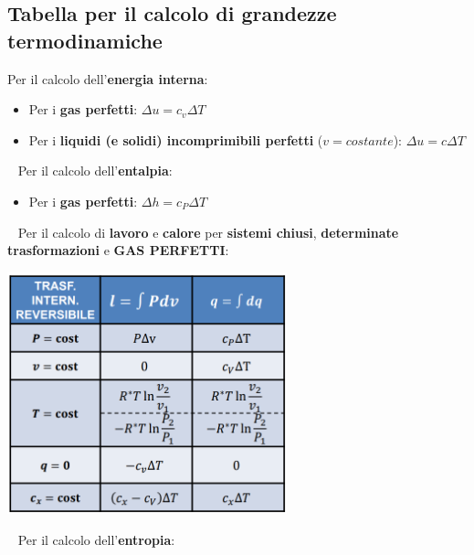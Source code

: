 \subsection{Tabella per il calcolo di grandezze termodinamiche}
Per il calcolo dell'\textbf{energia interna}:
\begin{itemize}
    \item Per i \textbf{gas perfetti}: $\Delta u = c_v \Delta T$
    \item Per i \textbf{liquidi (e solidi) incomprimibili perfetti} ($v = costante$): $\Delta u = c \Delta T$
\end{itemize}
\ \newline
\newline
Per il calcolo dell'\textbf{entalpia}:
\begin{itemize}
    \item Per i \textbf{gas perfetti}: $\Delta h = c_P \Delta T$
\end{itemize}
\ \newline
\newline
Per il calcolo di \textbf{lavoro} e \textbf{calore} per \textbf{sistemi chiusi}, \textbf{determinate trasformazioni} e \textbf{GAS PERFETTI}:
\begin{center}
    \includegraphics[height=7cm]{../L03/img11.PNG}
\end{center}
\ \newline
Per il calcolo dell'\textbf{entropia}:
